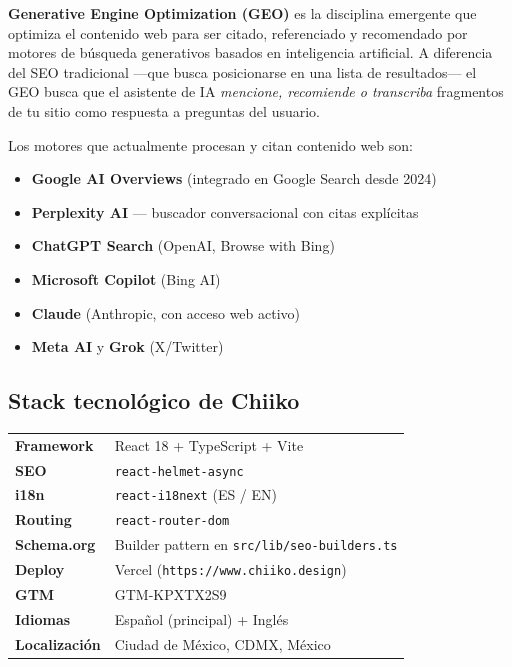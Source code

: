 \documentclass[12pt, a4paper]{article}
\begin{document}
\textbf{Generative Engine Optimization (GEO)} es la disciplina emergente que optimiza el contenido web para ser citado, referenciado y recomendado por motores de búsqueda generativos basados en inteligencia artificial. A diferencia del SEO tradicional —que busca posicionarse en una lista de resultados— el GEO busca que el asistente de IA \textit{mencione, recomiende o transcriba} fragmentos de tu sitio como respuesta a preguntas del usuario.

Los motores que actualmente procesan y citan contenido web son:

\begin{itemize}[label=\faRobot, itemsep=4pt]
  \item \textbf{Google AI Overviews} (integrado en Google Search desde 2024)
  \item \textbf{Perplexity AI} — buscador conversacional con citas explícitas
  \item \textbf{ChatGPT Search} (OpenAI, Browse with Bing)
  \item \textbf{Microsoft Copilot} (Bing AI)
  \item \textbf{Claude} (Anthropic, con acceso web activo)
  \item \textbf{Meta AI} y \textbf{Grok} (X/Twitter)
\end{itemize}

\subsection{Stack tecnológico de Chiiko}

\begin{infobox}
\begin{tabular}{L{4cm} L{9cm}}
  \textbf{Framework}      & React 18 + TypeScript + Vite \\
  \textbf{SEO}            & \texttt{react-helmet-async} \\
  \textbf{i18n}           & \texttt{react-i18next} (ES / EN) \\
  \textbf{Routing}        & \texttt{react-router-dom} \\
  \textbf{Schema.org}     & Builder pattern en \texttt{src/lib/seo-builders.ts} \\
  \textbf{Deploy}         & Vercel (\texttt{https://www.chiiko.design}) \\
  \textbf{GTM}            & GTM-KPXTX2S9 \\
  \textbf{Idiomas}        & Español (principal) + Inglés \\
  \textbf{Localización}   & Ciudad de México, CDMX, México \\
\end{tabular}
\end{infobox}
\end{document}

